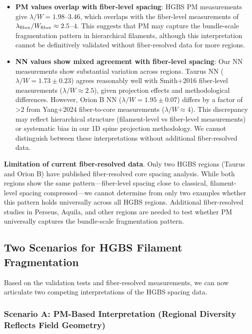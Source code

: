 \documentclass[twoside,twocolumn]{mnras}
\begin{document}
\begin{itemize}
    \item \textbf{PM values overlap with fiber-level spacing}: HGBS PM measurements give $\lambda/W = 1.98$--$3.46$, which overlaps with the fiber-level measurements of $\lambda_{\rm fiber}/W_{\rm fiber} \approx 2.5$--$4$. This suggests that PM may capture the bundle-scale fragmentation pattern in hierarchical filaments, although this interpretation cannot be definitively validated without fiber-resolved data for more regions.

    \item \textbf{NN values show mixed agreement with fiber-level spacing}: Our NN measurements show substantial variation across regions. Taurus NN ($\lambda/W = 1.73 \pm 0.23$) agrees reasonably well with Smith+2016 fiber-level measurements ($\lambda/W \approx 2.5$), given projection effects and methodological differences. However, Orion B NN ($\lambda/W = 1.95 \pm 0.07$) differs by a factor of >2 from Yang+2024 fiber-to-core measurements ($\lambda/W \approx 4$). This discrepancy may reflect hierarchical structure (filament-level vs fiber-level measurements) or systematic bias in our 1D spine projection methodology. We cannot distinguish between these interpretations without additional fiber-resolved data.
\end{itemize}

\textbf{Limitation of current fiber-resolved data}. Only two HGBS regions (Taurus and Orion B) have published fiber-resolved core spacing analysis. While both regions show the same pattern---fiber-level spacing close to classical, filament-level spacing compressed---we cannot determine from only two examples whether this pattern holds universally across all HGBS regions. Additional fiber-resolved studies in Perseus, Aquila, and other regions are needed to test whether PM universally captures the bundle-scale fragmentation pattern.

\subsection{Two Scenarios for HGBS Filament Fragmentation}

Based on the validation tests and fiber-resolved measurements, we can now articulate two competing interpretations of the HGBS spacing data.

\subsubsection{Scenario A: PM-Based Interpretation (Regional Diversity Reflects Field Geometry)}
\end{document}
